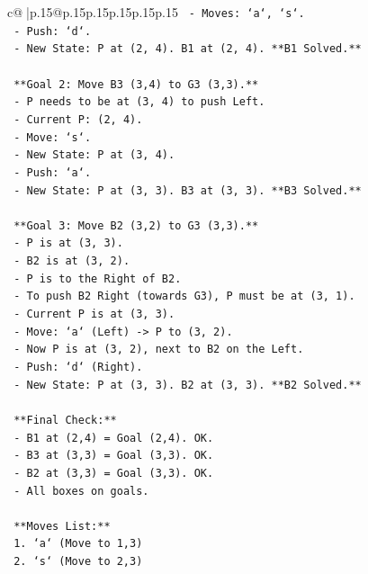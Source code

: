 \documentclass{article}
\begin{document}
{\begin{supertabular}{c@{$\;$}|p{.15\linewidth}@{}p{.15\linewidth}p{.15\linewidth}p{.15\linewidth}p{.15\linewidth}p{.15\linewidth}}
{{{\texttt{    {-} Moves: `a`, `s`.} \\
\texttt{    {-} Push: `d`.} \\
\texttt{    {-} New State: P at (2, 4). B1 at (2, 4). **B1 Solved.**} \\
\\ 
\texttt{    **Goal 2: Move B3 (3,4) to G3 (3,3).**} \\
\texttt{    {-} P needs to be at (3, 4) to push Left.} \\
\texttt{    {-} Current P: (2, 4).} \\
\texttt{    {-} Move: `s`.} \\
\texttt{    {-} New State: P at (3, 4).} \\
\texttt{    {-} Push: `a`.} \\
\texttt{    {-} New State: P at (3, 3). B3 at (3, 3). **B3 Solved.**} \\
\\ 
\texttt{    **Goal 3: Move B2 (3,2) to G3 (3,3).**} \\
\texttt{    {-} P is at (3, 3).} \\
\texttt{    {-} B2 is at (3, 2).} \\
\texttt{    {-} P is to the Right of B2.} \\
\texttt{    {-} To push B2 Right (towards G3), P must be at (3, 1).} \\
\texttt{    {-} Current P is at (3, 3).} \\
\texttt{    {-} Move: `a` (Left) {-}> P to (3, 2).} \\
\texttt{    {-} Now P is at (3, 2), next to B2 on the Left.} \\
\texttt{    {-} Push: `d` (Right).} \\
\texttt{    {-} New State: P at (3, 3). B2 at (3, 3). **B2 Solved.**} \\
\\ 
\texttt{    **Final Check:**} \\
\texttt{    {-} B1 at (2,4) = Goal (2,4). OK.} \\
\texttt{    {-} B3 at (3,3) = Goal (3,3). OK.} \\
\texttt{    {-} B2 at (3,3) = Goal (3,3). OK.} \\
\texttt{    {-} All boxes on goals.} \\
\\ 
\texttt{    **Moves List:**} \\
\texttt{    1. `a` (Move to 1,3)} \\
\texttt{    2. `s` (Move to 2,3)} \\
}}}
\end{supertabular}}
\end{document}
